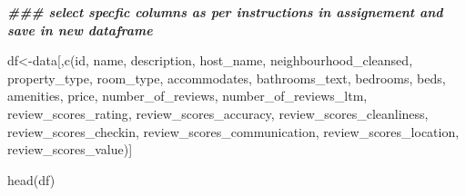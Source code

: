 \documentclass[
]{article}
\newenvironment{Shaded}{\begin{snugshade}}{\end{snugshade}}
\newcommand{\DocumentationTok}[1]{\textcolor[rgb]{0.56,0.35,0.01}{\textbf{\textit{#1}}}}
\newcommand{\FunctionTok}[1]{\textcolor[rgb]{0.00,0.00,0.00}{#1}}
\newcommand{\NormalTok}[1]{#1}
\newcommand{\OtherTok}[1]{\textcolor[rgb]{0.56,0.35,0.01}{#1}}
\newcommand{\StringTok}[1]{\textcolor[rgb]{0.31,0.60,0.02}{#1}}
\begin{document}
\begin{Shaded}
\begin{Highlighting}[]
\DocumentationTok{\#\#\# select specfic columns as per instructions in assignement and save in new dataframe}

\NormalTok{df}\OtherTok{\textless{}{-}}\NormalTok{data[,}\FunctionTok{c}\NormalTok{(}\StringTok{\textquotesingle{}id\textquotesingle{}}\NormalTok{, }\StringTok{\textquotesingle{}name\textquotesingle{}}\NormalTok{, }\StringTok{\textquotesingle{}description\textquotesingle{}}\NormalTok{, }\StringTok{\textquotesingle{}host\_name\textquotesingle{}}\NormalTok{, }\StringTok{\textquotesingle{}neighbourhood\_cleansed\textquotesingle{}}\NormalTok{, }\StringTok{\textquotesingle{}property\_type\textquotesingle{}}\NormalTok{, }\StringTok{\textquotesingle{}room\_type\textquotesingle{}}\NormalTok{, }
\StringTok{\textquotesingle{}accommodates\textquotesingle{}}\NormalTok{, }\StringTok{\textquotesingle{}bathrooms\_text\textquotesingle{}}\NormalTok{, }\StringTok{\textquotesingle{}bedrooms\textquotesingle{}}\NormalTok{, }\StringTok{\textquotesingle{}beds\textquotesingle{}}\NormalTok{, }\StringTok{\textquotesingle{}amenities\textquotesingle{}}\NormalTok{, }\StringTok{\textquotesingle{}price\textquotesingle{}}\NormalTok{, }\StringTok{\textquotesingle{}number\_of\_reviews\textquotesingle{}}\NormalTok{, }
\StringTok{\textquotesingle{}number\_of\_reviews\_ltm\textquotesingle{}}\NormalTok{, }\StringTok{\textquotesingle{}review\_scores\_rating\textquotesingle{}}\NormalTok{, }\StringTok{\textquotesingle{}review\_scores\_accuracy\textquotesingle{}}\NormalTok{, }\StringTok{\textquotesingle{}review\_scores\_cleanliness\textquotesingle{}}\NormalTok{, }
\StringTok{\textquotesingle{}review\_scores\_checkin\textquotesingle{}}\NormalTok{, }\StringTok{\textquotesingle{}review\_scores\_communication\textquotesingle{}}\NormalTok{, }\StringTok{\textquotesingle{}review\_scores\_location\textquotesingle{}}\NormalTok{, }
\StringTok{\textquotesingle{}review\_scores\_value\textquotesingle{}}\NormalTok{)]}
\end{Highlighting}
\end{Shaded}

\begin{Shaded}
\begin{Highlighting}[]
\FunctionTok{head}\NormalTok{(df)}
\end{Highlighting}
\end{Shaded}
\end{document}
